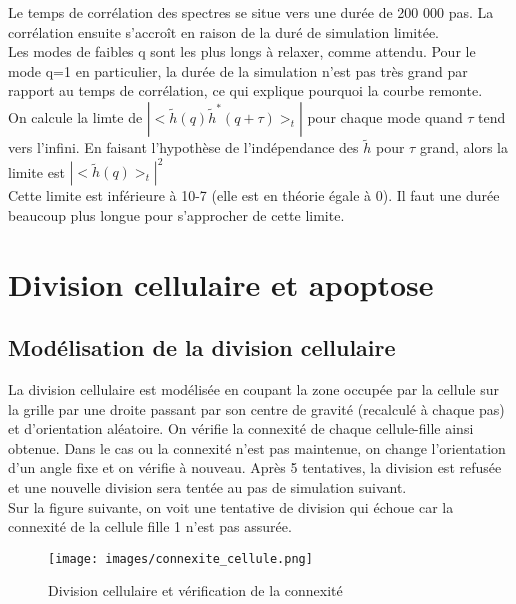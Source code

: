 \documentclass[11pt,a4paper]{article}
\begin{document}
Le temps de corrélation des spectres se situe vers une durée de 200 000 pas. La corrélation ensuite s'accroît en raison de la duré de simulation limitée.\\

Les modes de faibles q sont les plus longs à relaxer, comme attendu. Pour le mode q=1 en particulier, la durée de la simulation n'est pas très grand par rapport au temps de corrélation, ce qui explique pourquoi la courbe remonte.\\

On calcule la limte de $|<\tilde{h}(q) {\tilde{h}}^*(q+\tau)>_t|$ pour chaque mode quand $\tau$ tend vers l'infini. En faisant l'hypothèse de l'indépendance des $\tilde{h}$ pour $\tau$ grand, alors la limite est $|<\tilde{h}(q)>_t|^2$\\
Cette limite est inférieure à 10-7 (elle est en théorie égale à 0). Il faut une durée beaucoup plus longue pour s'approcher de cette limite.


\section{Division cellulaire et apoptose}

\subsection{Modélisation de la division cellulaire}

La division cellulaire est modélisée en coupant la zone occupée par la cellule sur la grille par une droite passant par son centre de gravité (recalculé à chaque pas) et d'orientation aléatoire. On vérifie la connexité de chaque cellule-fille ainsi obtenue. Dans le cas ou la connexité n'est pas maintenue, on change l'orientation d'un angle fixe et on vérifie à nouveau. Après 5 tentatives, la division est refusée et une nouvelle division sera tentée au pas de simulation suivant.\\

Sur la figure suivante, on voit une tentative de division qui échoue car la connexité de la cellule fille 1 n'est pas assurée.

\begin{figure}[H]
\begin{center}
\texttt{[image: images/connexite\_cellule.png]}
\caption{Division cellulaire et vérification de la connexité}
\label{mafigure}
\end{center}
\end{figure}
\end{document}
